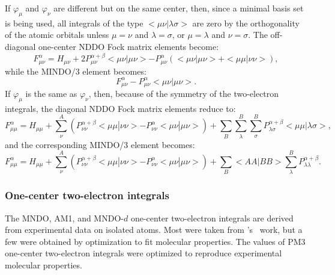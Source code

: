 \documentclass[a4paper]{book}
\begin{document}
If $\varphi_{\mu}$ and $\varphi_{\nu}$  are different but on the same center,
then, since a minimal basis set is being used, all integrals of the type
$<\!\mu\nu|\lambda\sigma\!>$ are zero by the orthogonality of the atomic
orbitals unless $\mu=\nu$ and $\lambda=\sigma$, or $\mu=\lambda$ and
$\nu=\sigma$.  The off-diagonal one-center NDDO Fock matrix elements become:
$$
 F_{\mu\nu}^{\alpha} = H_{\mu\nu}+ 2P_{\mu\nu}^{\alpha+\beta} <\mu\nu|\mu\nu>
- P_{\mu\nu}^{\alpha}( <\mu\nu|\mu\nu> +<\mu\mu|\nu\nu>),
$$
while the MINDO/3 element becomes:
$$
F_{\mu\nu}^{\alpha} - P_{\mu\nu}^{\alpha} <\mu\nu|\mu\nu>.
$$
 If  $\varphi_{\mu}$ is the same as $\varphi_{\nu}$,  then, because of the
symmetry of the two-electron integrals, the diagonal NDDO
Fock matrix elements reduce to:
$$
F_{\mu\mu}^{\alpha} = H_{\mu\mu}+ \sum_{\nu}^A(P_{\nu\nu}^{\alpha+\beta}
<\mu\mu|\nu\nu> - P_{\nu\nu}^{\alpha}<\mu\nu|\mu\nu>)
+\sum_B\sum_{\lambda}^B\sum_{\sigma}^BP_{\lambda\sigma}^{\alpha+\beta}<\mu\mu|\lambda\sigma>,
$$
and the corresponding MINDO/3 element becomes:
$$
F_{\mu\mu}^{\alpha} = H_{\mu\mu}+ \sum_{\nu}^A(P_{\nu\nu}^{\alpha+\beta}
<\mu\mu|\nu\nu> - P_{\nu\nu}^{\alpha}<\mu\nu|\mu\nu>)
+\sum_B<AA|BB>\sum_{\lambda}^B P_{\lambda\lambda}^{\alpha+\beta}.
$$

\subsubsection{One-center two-electron integrals}
The MNDO, AM1, and MNDO-$d$ one-center two-electron integrals are derived from
experimental data on isolated atoms. Most were taken from
's~\cite{oleari} work, but a few were obtained by optimization to
fit molecular properties. The values of PM3 one-center two-electron integrals
were optimized to reproduce experimental molecular properties.
\end{document}
